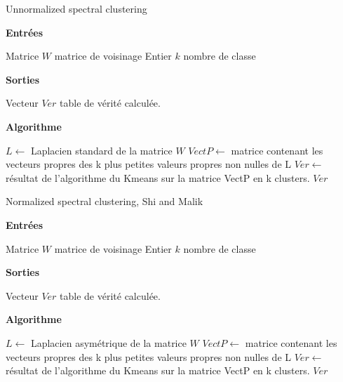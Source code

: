 \begin{algorithm}[H]
  \caption{Unnormalized spectral clustering }
  
  \textbf{Entrées}%
  \begin{algorithmic}[1]
    \STATE Matrice $W$ matrice de voisinage
    \STATE Entier $k$ nombre de classe
  \end{algorithmic}
  \bigskip

  \textbf{Sorties}%
  \begin{algorithmic}[1]
    \STATE Vecteur $Ver$ table de vérité calculée.
  \end{algorithmic}
  \bigskip
  
  \textbf{Algorithme}
  \begin{algorithmic}[1]
		\STATE $L\gets$ Laplacien standard de la matrice $W$
     	\STATE $VectP\gets$ matrice contenant les vecteurs propres des k plus petites valeurs propres non nulles de L
     	\STATE $Ver\gets$ résultat de l'algorithme du Kmeans sur la matrice VectP en k clusters.	
  \RETURN $Ver$
  \end{algorithmic}
\end{algorithm}



\begin{algorithm}[H]
  \caption{Normalized spectral clustering, Shi and Malik }
  
  \textbf{Entrées}%
  \begin{algorithmic}[1]
    \STATE Matrice $W$ matrice de voisinage
    \STATE Entier $k$ nombre de classe
  \end{algorithmic}
  \bigskip

  \textbf{Sorties}%
  \begin{algorithmic}[1]
    \STATE Vecteur $Ver$ table de vérité calculée.
  \end{algorithmic}
  \bigskip
  
  \textbf{Algorithme}
  \begin{algorithmic}[1]
		\STATE $L\gets$ Laplacien asymétrique de la matrice $W$
     	\STATE $VectP\gets$ matrice contenant les vecteurs propres des k plus petites valeurs propres non nulles de L
     	\STATE $Ver\gets$ résultat de l'algorithme du Kmeans sur la matrice VectP en k clusters.	
  \RETURN $Ver$
  \end{algorithmic}
\end{algorithm}




